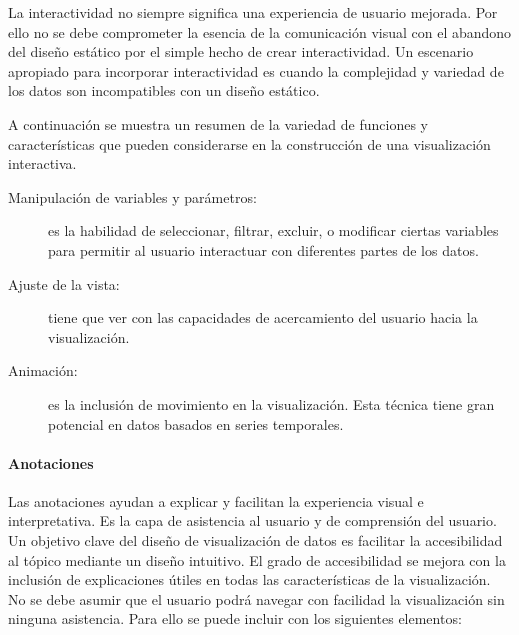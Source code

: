La interactividad no siempre significa una experiencia de usuario mejorada. Por ello no se debe comprometer la esencia de la comunicación visual con el abandono del diseño estático por el simple hecho de crear interactividad. Un escenario apropiado para incorporar interactividad es cuando la complejidad y variedad de los datos son incompatibles con un diseño estático.

A continuación se muestra un resumen de la variedad de funciones y características que pueden considerarse en la construcción de una visualización interactiva.

\begin{description}
  \item[Manipulación de variables y parámetros:] es la habilidad de seleccionar, filtrar, excluir, o modificar ciertas variables para permitir al usuario interactuar con diferentes partes de los datos.
  \item[Ajuste de la vista:] tiene que ver con las capacidades de acercamiento del usuario hacia la visualización.
  \item[Animación:] es la inclusión de movimiento en la visualización. Esta técnica tiene gran potencial en datos basados en series temporales.
\end{description}

\paragraph{Anotaciones}

Las anotaciones ayudan a explicar y facilitan la experiencia visual e interpretativa. Es la capa de asistencia al usuario y de comprensión del usuario. Un objetivo clave del diseño de visualización de datos es facilitar la accesibilidad al tópico mediante un diseño intuitivo. El grado de accesibilidad se mejora con la inclusión de explicaciones útiles en todas las características de la visualización. No se debe asumir que el usuario podrá navegar con facilidad la visualización sin ninguna asistencia. Para ello se puede incluir con los siguientes elementos:

